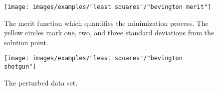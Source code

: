 \begin{figure}[htbp] %
   \centering
   \texttt{[image: images/examples/"least squares"/"bevington merit"]} 
   \caption{The merit function which quantifies the minimization process. The yellow circles mark one, two, and three standard deviations from the solution point.}
   \label{fig:Bevington merit functions}
\end{figure}

\begin{figure}[htbp] %
   \centering
   \texttt{[image: images/examples/"least squares"/"bevington shotgun"]} 
   \caption{The perturbed data set.}
   \label{fig:Bevington perturbed}
\end{figure}

\clearpage

\endinput